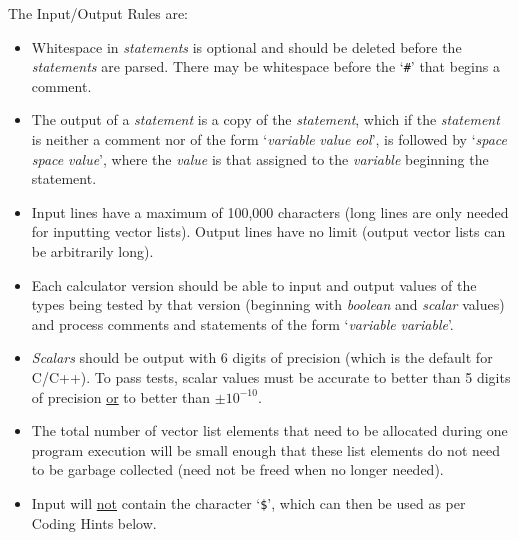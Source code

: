 \documentclass[12pt]{article}
\begin{document}
The Input/Output Rules are:
\begin{indpar}{0.2in}\begin{itemize}

\item Whitespace in {\em statements} is optional and should be deleted
before the {\em statements} are parsed.  There may be whitespace
before the `{\tt \#}' that begins a comment.

\item The output of a {\em statement} is a copy of the {\em statement},
which if the {\em statement} is neither a comment nor of the form
`{\em variable} \TT{=} {\em value} {\em eol}', 
is followed by `{\em space} \TT{=} {\em space} {\em value}', where
the {\em value} is that assigned to the {\em variable} beginning the
statement.

\item Input lines have a maximum of 100,000 characters (long lines
are only needed for inputting vector lists).  Output lines have
no limit (output vector lists can be arbitrarily long).

\item Each calculator version should be able to input and output
values of the types being tested by that version (beginning with
{\em boolean} and {\em scalar} values) and process comments
and statements of the form `{\em variable} \TT{=} {\em variable}'.

\item {\em Scalars} should be output with 6 digits of precision
(which is the default for C/C++).  To pass tests, scalar values
must be accurate to better than 5 digits of precision \underline{or}
to better than $\pm 10^{-10}$.

\item  The total number of vector list elements that need to be
allocated during one program execution will be small enough
that these list elements do not need to be garbage collected
(need not be freed when no longer needed).

\item Input will \underline{not} contain the character `{\tt \$}',
which can then be used as per Coding Hints below.


\end{itemize}\end{indpar}

\newpage
\end{document}
